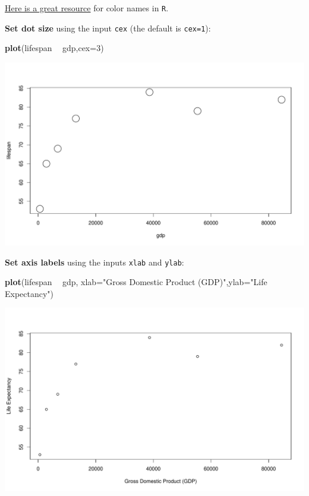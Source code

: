 \documentclass[
]{book}
\newenvironment{Shaded}{\begin{snugshade}}{\end{snugshade}}
\newcommand{\DataTypeTok}[1]{\textcolor[rgb]{0.13,0.29,0.53}{#1}}
\newcommand{\DecValTok}[1]{\textcolor[rgb]{0.00,0.00,0.81}{#1}}
\newcommand{\KeywordTok}[1]{\textcolor[rgb]{0.13,0.29,0.53}{\textbf{#1}}}
\newcommand{\NormalTok}[1]{#1}
\newcommand{\OperatorTok}[1]{\textcolor[rgb]{0.81,0.36,0.00}{\textbf{#1}}}
\newcommand{\StringTok}[1]{\textcolor[rgb]{0.31,0.60,0.02}{#1}}
\begin{document}
\href{http://www.stat.columbia.edu/~tzheng/files/Rcolor.pdf?utm_source=twitterfeed\&utm_medium=twitter}{Here is a great resource} for color names in \texttt{R}.

\textbf{Set dot size} using the input \texttt{cex} (the default is \texttt{cex=1}):

\begin{Shaded}
\begin{Highlighting}[]
\KeywordTok{plot}\NormalTok{(lifespan }\OperatorTok{~}\StringTok{ }\NormalTok{gdp,}\DataTypeTok{cex=}\DecValTok{3}\NormalTok{)}
\end{Highlighting}
\end{Shaded}

\includegraphics{figures/unnamed-chunk-108-1.pdf}

\textbf{Set axis labels} using the inputs \texttt{xlab} and \texttt{ylab}:

\begin{Shaded}
\begin{Highlighting}[]
\KeywordTok{plot}\NormalTok{(lifespan }\OperatorTok{~}\StringTok{ }\NormalTok{gdp, }\DataTypeTok{xlab=}\StringTok{"Gross Domestic Product (GDP)"}\NormalTok{,}\DataTypeTok{ylab=}\StringTok{"Life Expectancy"}\NormalTok{)}
\end{Highlighting}
\end{Shaded}

\includegraphics{figures/unnamed-chunk-109-1.pdf}
\end{document}
